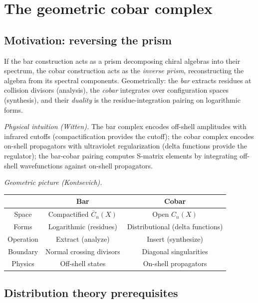 \section{The geometric cobar complex}

\subsection{Motivation: reversing the prism}

\begin{remark}
If the bar construction acts as a prism decomposing chiral algebras into their spectrum, the cobar construction acts as the \emph{inverse prism}, reconstructing the algebra from its spectral components. Geometrically: the \emph{bar} extracts residues at collision divisors (analysis), the \emph{cobar} integrates over configuration spaces (synthesis), and their \emph{duality} is the residue-integration pairing on logarithmic forms.

\emph{Physical intuition \textup{(Witten)}.}
The bar complex encodes off-shell amplitudes with infrared cutoffs (compactification provides the cutoff); the cobar complex encodes on-shell propagators with ultraviolet regularization (delta functions provide the regulator); the bar-cobar pairing computes S-matrix elements by integrating off-shell wavefunctions against on-shell propagators.

\emph{Geometric picture \textup{(Kontsevich)}.}
\begin{center}
\begin{tabular}{c|c|c}
& \textbf{Bar} & \textbf{Cobar} \\ \hline
Space & Compactified $\overline{C}_n(X)$ & Open $C_n(X)$ \\
Forms & Logarithmic (residues) & Distributional (delta functions) \\
Operation & Extract (analyze) & Insert (synthesize) \\
Boundary & Normal crossing divisors & Diagonal singularities \\
Physics & Off-shell states & On-shell propagators \\
\end{tabular}
\end{center}
\end{remark}

\subsection{Distribution theory prerequisites}

